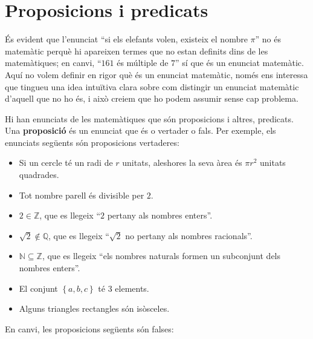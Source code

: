 \section{Proposicions i predicats{}}

És evident que l'enunciat \enquote{si els elefants volen, existeix el nombre $\pi $} no és matemàtic perquè hi apareixen termes que no estan
definits dins de les matemàtiques; en canvi, \enquote{$161$ és múltiple
de $7$} sí que és un enunciat matemàtic. Aquí no volem
definir en rigor què és un enunciat matemàtic, només ens
interessa que tingueu una idea intuïtiva clara sobre com distingir un
enunciat matemàtic d'aquell que no ho és, i això creiem que ho
podem assumir sense cap problema.

Hi han enunciats de les matemàtiques que són proposicions i altres,
predicats. Una \textbf{proposició} és un enunciat que és o
vertader o fals. Per exemple, els enunciats següents són
proposicions vertaderes:

\begin{itemize}
\item Si un cercle té un radi de $r$ unitats, aleshores la seva àrea
és $\pi r^{2}$ unitats quadrades.

\item Tot nombre parell és divisible per $2$.

\item $2\in\mathbb{Z}$, que es llegeix \enquote{$2$ pertany als nombres enters}.

\item $\sqrt{2}\notin\mathbb{Q}$, que es llegeix \enquote{$\sqrt{2}$ no pertany als
nombres racionals}.

\item $\mathbb{N}\subseteq\mathbb{Z}$, que es llegeix \enquote{els nombres naturals
formen un subconjunt dels nombres enters}.

\item El conjunt $\left\{ a,b,c\right\} $ té 3 elements.

\item Alguns triangles rectangles són isòsceles.
\end{itemize}

En canvi, les proposicions següents són falses:


